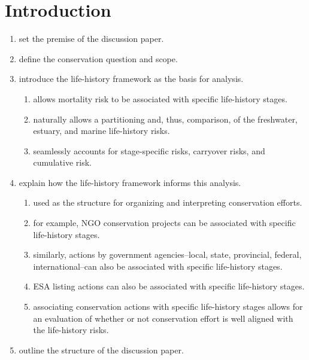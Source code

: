 \section{Introduction}
\label{sec:introduction}

\begin{enumerate}[label=\arabic*.]
    \item set the premise of the discussion paper.
    \item define the conservation question and scope.
    \item introduce the life-history framework as the basis for analysis.
    \begin{enumerate}[label=\arabic{enumi}\alph*., leftmargin=*]
        \item allows mortality risk to be associated with specific life-history stages.
        \item naturally allows a partitioning and, thus, comparison, of the freshwater, estuary, and marine life-history risks.
        \item seamlessly accounts for stage-specific risks, carryover risks, and cumulative risk.
    \end{enumerate}
    \item explain how the life-history framework informs this analysis.
    \begin{enumerate}[label=\arabic{enumi}\alph*., leftmargin=*]
        \item used as the structure for organizing and interpreting conservation efforts.
        \item for example, NGO conservation projects can be associated with specific life-history stages.
        \item similarly, actions by government agencies--local, state, provincial, federal, international--can also be associated with specific life-history stages.
        \item ESA listing actions can also be associated with specific life-history stages.
        \item associating conservation actions with specific life-history stages allows for an evaluation of whether or not conservation effort is well aligned with the life-history risks.
    \end{enumerate}
    \item outline the structure of the discussion paper.
    \begin{enumerate}[label=\arabic{enumi}\alph*., leftmargin=*]

\end{enumerate}
\end{enumerate}
